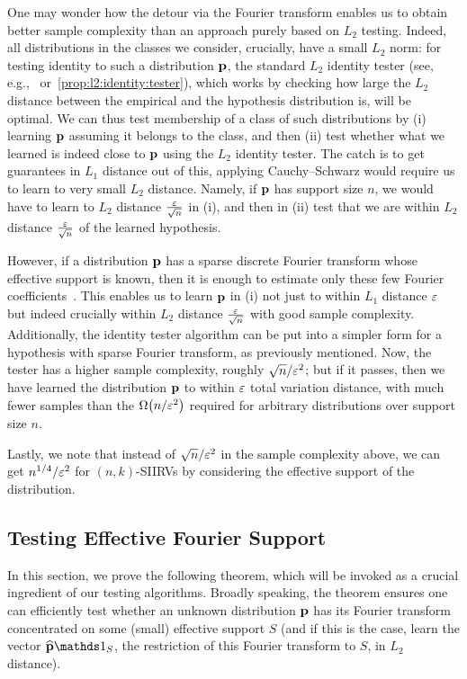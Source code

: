 One may wonder how the detour via the Fourier transform enables us to obtain better sample complexity than an approach purely based on $L_2$ testing.  Indeed, all distributions in the classes we consider, crucially, have a small $L_2$ norm: for testing identity to such a distribution $\mathbf{p}$, the standard $L_2$ identity tester (see, e.g.,~\cite{CDVV:14} or~\cref{prop:l2:identity:tester}), which works by checking how large the $L_2$ distance between the empirical and the hypothesis distribution is, will be optimal. We can thus test membership of a class of such distributions by (i) learning $\mathbf{p}$ assuming it belongs to the class, and then (ii) test whether what we learned is indeed close to $\mathbf{p}$ using the $L_2$ identity tester. The catch is to get guarantees in $L_1$ distance out of this, applying Cauchy--Schwarz would require us to learn to very small $L_2$ distance. Namely, if $\mathbf{p}$ has support size $n$, we would have to learn to $L_2$ distance $\frac{\varepsilon}{\sqrt{n}}$ in (i), and then in (ii) test that we are within $L_2$ distance $\frac{\varepsilon}{\sqrt{n}}$ of the learned hypothesis.

However, if a distribution $\mathbf{p}$ has a sparse discrete Fourier transform whose effective support is known, then it is enough to estimate only these few Fourier coefficients~\cite{DKS:15,DKS:15c}. This enables us to learn $\mathbf{p}$ in (i) not just to within $L_1$ distance $\varepsilon$ but indeed crucially within $L_2$ distance $\frac{\varepsilon}{\sqrt{n}}$ with good sample complexity. Additionally, the identity tester algorithm can be put into a simpler form for a hypothesis with sparse Fourier transform, as previously mentioned. Now, the tester has a higher sample complexity, roughly $\sqrt{n}/\varepsilon^2$; but if it passes, then we have learned the distribution $\mathbf{p}$ to within $\varepsilon$ total variation distance, with much fewer samples than the $\bigOmega{n/\eps^2}$ required for arbitrary distributions over support size $n$.

Lastly, we note that instead of $\sqrt{n}/\varepsilon^2$ in the sample complexity above, we can get $n^{1/4}/\varepsilon^2$ for $(n,k)$-SIIRVs by considering the effective support of the distribution.

\subsection{Testing Effective Fourier Support}\label{sec:fourier:support:testing}
In this section, we prove the following theorem, which will be invoked as a crucial ingredient of our testing algorithms. Broadly speaking, the theorem ensures one can efficiently test whether an unknown distribution $\mathbf{p}$ has its Fourier transform concentrated on some (small) effective support $S$ (and if this is the case, learn the vector $\fourier{\q}\indicSet{S}$, the restriction of this Fourier transform to $S$, in $L_2$ distance).

